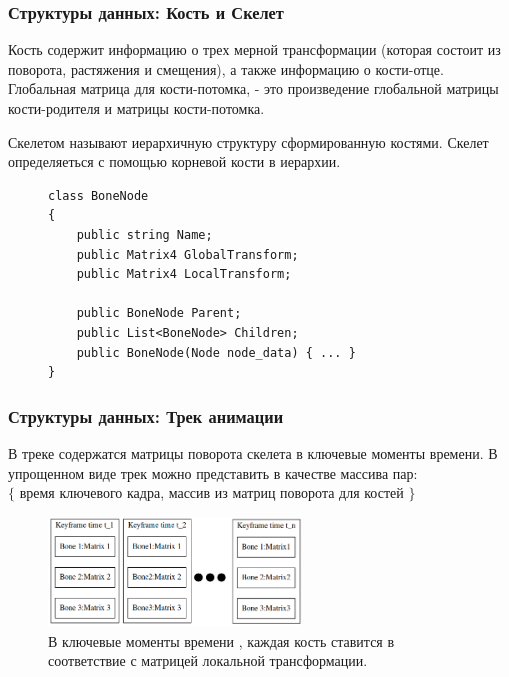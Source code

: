 \documentclass{beamer}
\newcommand{\Code}[1]{\detokenize{#1}}
\begin{document}
  
\begin{frame}[fragile]
\frametitle{Структуры данных: Кость и Скелет}
\alert{Кость} содержит информацию о трех мерной трансформации (которая состоит из поворота, растяжения и смещения), а также информацию о кости-отце. Глобальная матрица для кости-потомка, - это произведение глобальной матрицы кости-родителя и матрицы кости-потомка. 

\medskip

\alert{Скелетом} называют иерархичную структуру сформированную костями. Скелет определяеться с помощью корневой кости в иерархии.

\begin{scriptsize}
\begin{figure}[h!]
\begin{verbatim}
class BoneNode
{
    public string Name;
    public Matrix4 GlobalTransform;
    public Matrix4 LocalTransform;

    public BoneNode Parent;
    public List<BoneNode> Children;
    public BoneNode(Node node_data) { ... }
}
\end{verbatim}
\end{figure}
\end{scriptsize}

\end{frame}


  
\begin{frame}
\frametitle{Структуры данных: Трек анимации}
\begin{small}
В треке содержатся матрицы поворота скелета в ключевые моменты времени.
В упрощенном виде трек можно представить в качестве  массива пар: \\
$\lbrace$ время ключевого кадра, массив из матриц поворота для костей $\rbrace$

\begin{figure}[h!]
    \centering
    \includegraphics[width=0.6\textwidth]{anim_track.png}
    \caption{\scriptsize{В ключевые моменты времени \Code{(t_1, t_2, ... t_n)}, каждая кость ставится в соответствие с матрицей локальной трансформации.}}
\end{figure}


\end{small}
\end{frame}
\end{document}
